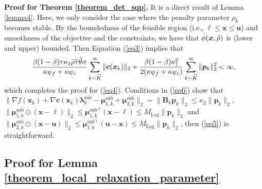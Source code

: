 \documentclass[aos]{imsart}
\numberwithin{equation}{section}
\theoremstyle{plain}
\begin{document}
\begin{appendix}
\textbf{Proof for Theorem \ref{theorem_det_sqp}.}
     It is a direct result of Lemma \ref{lemma4}. Here, we only consider the case where the penalty parameter $\rho_k$ becomes stable. By the boundedness of the feasible region (i.e., $\bm{\ell} \leq \bm{x} \leq \bm{u}$) and smoothness of the objective and the constraints, we have that $\phi(\bm{x},\Tilde{\rho})$ is (lower and upper) bounded. Then Equation (\ref{eq3}) implies that
     \begin{equation*}
          \frac{\beta (1-\beta) \tau\kappa_1 \Tilde{\rho} \Tilde{\tau} \Tilde{\theta} \sigma}{\kappa_{\nabla f}+\kappa_{\nabla c}} \sum_{k=\widetilde{K}}^{\infty} \|\bm{c}(\bm{x}_k)\|_2 + \frac{\beta (1-\beta)\kappa_1^2}{2(\kappa_{\nabla f}+\kappa_{\nabla c})} \sum_{k=\widetilde{K}}^{\infty} \|\bm{p}_k\|_2^2 < \infty,
     \end{equation*}
     which completes the proof for (\ref{eq4}). Conditions in (\ref{eq6}) show that $\| \nabla f(\bm{x}_k) +  \nabla \bm{c}(\bm{x}_k) \bm{\lambda}_k^{\text{sub}} - \bm{\mu}_{1,k}^{\text{sub}} + \bm{\mu}_{2,k}^{\text{sub}} \|_2 = \|\bm{B}_k\bm{p}_k\|_2 \leq \kappa_2 \|\bm{p}_k\|_2$, $\|\bm{\mu}_{1,k}^{\text{sub}} \odot (\bm{x}-\bm{\ell})\|_2 \leq \bm{\mu}_{1,k}^{\text{sub} \top}(\bm{x}-\bm{\ell}) \leq M_{\text{Lag}}\|\bm{p}_k\|_2$ and $\|\bm{\mu}_{2,k}^{\text{sub}} \odot (\bm{x}-\bm{u})\|_2 \leq \bm{\mu}_{1,k}^{\text{sub} \top}(\bm{u}-\bm{x}) \leq M_{\text{Lag}}\|\bm{p}_k\|_2$, then (\ref{eq5}) is straightforward.

\subsection{Proof for Lemma \ref{theorem_local_relaxation_parameter}}
\label{sec:appendix1.4}


\end{appendix}
\end{document}
